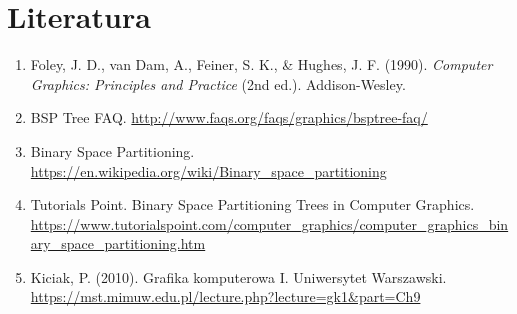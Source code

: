 \documentclass[a4paper,12pt]{article}
\begin{document}
\section{Literatura}
\begin{enumerate}
    \item Foley, J. D., van Dam, A., Feiner, S. K., \& Hughes, J. F. (1990). \textit{Computer Graphics: Principles and Practice} (2nd ed.). Addison-Wesley.
    \item BSP Tree FAQ. \url{http://www.faqs.org/faqs/graphics/bsptree-faq/}
    \item Binary Space Partitioning. \url{https://en.wikipedia.org/wiki/Binary_space_partitioning}
    \item Tutorials Point. Binary Space Partitioning Trees in Computer Graphics. \url{https://www.tutorialspoint.com/computer_graphics/computer_graphics_binary_space_partitioning.htm}
    \item Kiciak, P. (2010). Grafika komputerowa I. Uniwersytet Warszawski. \url{https://mst.mimuw.edu.pl/lecture.php?lecture=gk1&part=Ch9}
\end{enumerate}
\end{document}
